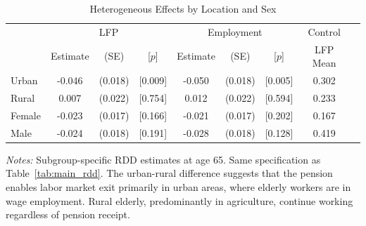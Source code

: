 \begin{table}[t]
\centering
\begin{threeparttable}
\caption{Heterogeneous Effects by Location and Sex}
\label{tab:heterogeneity}
\begin{tabular}{lcccccccc}
\hline\hline
  & \multicolumn{3}{c}{LFP} & \multicolumn{3}{c}{Employment} & Control \\
  & Estimate & (SE) & [$p$] & Estimate & (SE) & [$p$] & LFP Mean \\
\hline
  Urban & -0.046 & (0.018) & [0.009] & -0.050 & (0.018) & [0.005] & 0.302 \\
  Rural & 0.007 & (0.022) & [0.754] & 0.012 & (0.022) & [0.594] & 0.233 \\
  Female & -0.023 & (0.017) & [0.166] & -0.021 & (0.017) & [0.202] & 0.167 \\
  Male & -0.024 & (0.018) & [0.191] & -0.028 & (0.018) & [0.128] & 0.419 \\
\hline\hline
\end{tabular}
\begin{tablenotes}
\item \textit{Notes:} Subgroup-specific RDD estimates at age 65. Same specification as Table~\ref{tab:main_rdd}. The urban-rural difference suggests that the pension enables labor market exit primarily in urban areas, where elderly workers are in wage employment. Rural elderly, predominantly in agriculture, continue working regardless of pension receipt.
\end{tablenotes}
\end{threeparttable}
\end{table}
